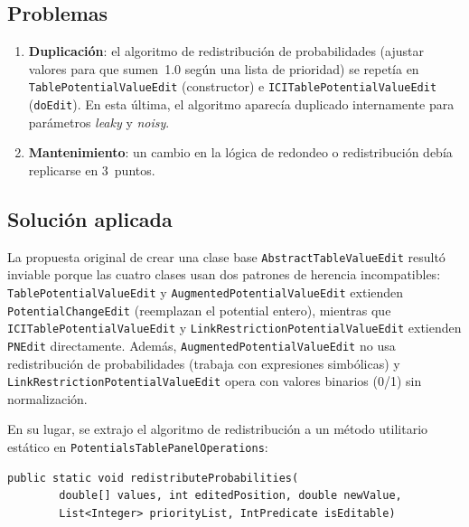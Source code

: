 \documentclass[12pt,a4paper]{article}
\newcommand{\clase}[1]{\texttt{#1}}
\newcommand{\metodo}[1]{\texttt{#1}}
\newcommand{\bad}[1]{\textcolor{codered}{\textbf{#1}}}
\newcommand{\warn}[1]{\textcolor{warnorange}{\textbf{#1}}}
\begin{document}
\subsection{Problemas}

\begin{enumerate}
  \item \bad{Duplicación}: el algoritmo de redistribución de
        probabilidades (ajustar valores para que sumen~1.0 según
        una lista de prioridad) se repetía en
        \clase{TablePotentialValueEdit} (constructor) e
        \clase{ICITablePotentialValueEdit} (\metodo{doEdit}).
        En esta última, el algoritmo aparecía duplicado internamente
        para parámetros \emph{leaky} y \emph{noisy}.
  \item \warn{Mantenimiento}: un cambio en la lógica de redondeo o
        redistribución debía replicarse en 3~puntos.
\end{enumerate}

\subsection{Solución aplicada}

La propuesta original de crear una clase base
\clase{AbstractTableValueEdit} resultó inviable porque las cuatro
clases usan dos patrones de herencia incompatibles:
\clase{TablePotentialValueEdit} y \clase{AugmentedPotentialValueEdit}
extienden \clase{PotentialChangeEdit} (reemplazan el potential
entero), mientras que \clase{ICITablePotentialValueEdit} y
\clase{LinkRestrictionPotentialValueEdit} extienden \clase{PNEdit}
directamente. Además, \clase{AugmentedPotentialValueEdit} no usa
redistribución de probabilidades (trabaja con expresiones simbólicas)
y \clase{LinkRestrictionPotentialValueEdit} opera con valores binarios
(0/1) sin normalización.

En su lugar, se extrajo el algoritmo de redistribución a un método
utilitario estático en \clase{PotentialsTablePanelOperations}:

\begin{lstlisting}[caption={Método utilitario de redistribución de probabilidades}]
public static void redistributeProbabilities(
        double[] values, int editedPosition, double newValue,
        List<Integer> priorityList, IntPredicate isEditable)
\end{lstlisting}
\end{document}
